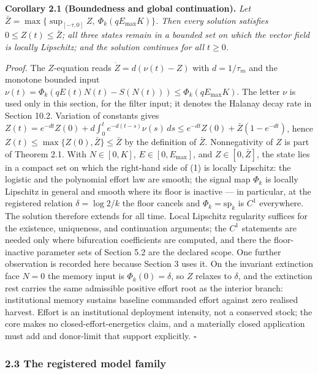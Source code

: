 \documentclass[11pt]{article}
\begin{document}
\textbf{Corollary 2.1 (Boundedness and global continuation).} \emph{Let
\(\bar Z = \max\{ \sup_{[-\tau,0]} Z,\ \Phi_k(qE_{\max}K) \}\). Then
every solution satisfies \(0 \le Z(t) \le \bar Z\); all three states
remain in a bounded set on which the vector field is locally Lipschitz;
and the solution continues for all \(t \ge 0\).}

\emph{Proof.} The \(Z\)-equation reads \(\dot Z = d(\nu(t) - Z)\) with
\(d = 1/\tau_m\) and the monotone bounded input
\(\nu(t) = \Phi_k(qE(t)N(t) - S(N(t))) \le \Phi_k(qE_{\max}K)\). The
letter \(\nu\) is used only in this section, for the filter input; it
denotes the Halanay decay rate in Section 10.2. Variation of constants
gives
\(Z(t) = e^{-dt}Z(0) + d\int_0^t e^{-d(t-s)}\nu(s)\,ds \le e^{-dt}Z(0) + \bar Z(1 - e^{-dt})\),
hence \(Z(t) \le \max\{Z(0), \bar Z\} \le \bar Z\) by the definition of
\(\bar Z\). Nonnegativity of \(Z\) is part of Theorem 2.1. With
\(N \in [0,K]\), \(E \in [0, E_{\max}]\), and \(Z \in [0, \bar Z]\), the
state lies in a compact set on which the right-hand side of (1) is
locally Lipschitz: the logistic and the polynomial effort law are
smooth; the signal map \(\Phi_k\) is locally Lipschitz in general and
smooth where its floor is inactive --- in particular, at the registered
relation \(\delta = \log 2 / k\) the floor cancels and
\(\Phi_k = \mathrm{sp}_k\) is \(C^1\) everywhere. The solution therefore
extends for all time. Local Lipschitz regularity suffices for the
existence, uniqueness, and continuation arguments; the \(C^1\)
statements are needed only where bifurcation coefficients are computed,
and there the floor-inactive parameter sets of Section 5.2 are the
declared scope. One further observation is recorded here because Section
3 uses it. On the invariant extinction face \(N = 0\) the memory input
is \(\Phi_k(0) = \delta\), so \(Z\) relaxes to \(\delta\), and the
extinction rest carries the same admissible positive effort root as the
interior branch: institutional memory sustains baseline commanded effort
against zero realised harvest. Effort is an institutional deployment
intensity, not a conserved stock; the core makes no
closed-effort-energetics claim, and a materially closed application must
add and donor-limit that support explicitly. \ensuremath{\square}

\subsubsection{2.3 The registered model
family}\label{the-registered-model-family}
\end{document}
